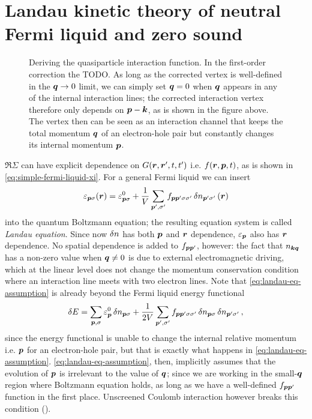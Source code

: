 \documentclass[hyperref, a4paper]{article}
\newcommand*{\term}[1]{\textit{#1}}
\begin{document}
\section{Landau kinetic theory of neutral Fermi liquid and zero sound} 

\begin{figure}
    \centering
    
    \caption{Deriving the quasiparticle interaction function.
    In the first-order correction the TODO.
    As long as the corrected vertex is well-defined in the $\vb*{q} \to 0$ limit, 
    we can simply set $\vb*{q} = 0$ when $\vb*{q}$ appears 
    in any of the internal interaction lines;
    the corrected interaction vertex therefore only depends on $\vb*{p} - \vb*{k}$,
    as is shown in the figure above.
    The vertex then can be seen as an interaction channel 
    that keeps the total momentum $\vb*{q}$ of an electron-hole pair 
    but constantly changes its internal momentum $\vb*{p}$.}
\end{figure}

$\Re \Sigma$ can have explicit dependence on $G(\vb*{r}, \vb*{r}', t, t')$
i.e. $f(\vb*{r}, \vb*{p}, t)$,
as is shown in \eqref{eq:simple-fermi-liquid-xi}.
For a general Fermi liquid we can insert
\begin{equation}
    \varepsilon_{\vb*{p} \sigma}(\vb*{r}) = \varepsilon^0_{\vb*{p} \sigma} + 
    \frac{1}{V} \sum_{\vb*{p}', \sigma'} f_{\vb*{p} \vb*{p}' \sigma \sigma'} \var{n}_{\vb*{p}' \sigma'} (\vb*{r})
    \label{eq:landau-eq-assumption}
\end{equation}
into the quantum Boltzmann equation;
the resulting equation system is called \term{Landau equation}.
Since now $\var{n}$ has both $\vb*{p}$ and $\vb*{r}$ dependence,
$\varepsilon_{\vb*{p}}$ also has $\vb*{r}$ dependence.
No spatial dependence is added to $f_{\vb*{p} \vb*{p}'}$, however:
the fact that $n_{\vb*{k} \vb*{q}}$ has a non-zero value when $\vb*{q} \neq 0$
is due to external electromagnetic driving, 
which at the linear level does not change
the momentum conservation condition 
where an interaction line meets with two electron lines.
Note that \eqref{eq:landau-eq-assumption} is already beyond 
the Fermi liquid energy functional
\begin{equation}
    \var{E} = \sum_{\vb*{p}, \sigma} \varepsilon^0_{\vb*{p}} \var{n}_{\vb*{p} \sigma}
    + \frac{1}{2V} \sum_{\vb*{p}', \sigma'} f_{\vb*{p} \vb*{p}' \sigma \sigma'}
    \var{n}_{\vb*{p} \sigma} \var{n}_{\vb*{p}' \sigma'},
\end{equation}
since the energy functional is unable to change the internal relative momentum
i.e. $\vb*{p}$ for an electron-hole pair,
but that is exactly what happens in \eqref{eq:landau-eq-assumption}.
\eqref{eq:landau-eq-assumption}, then, implicitly assumes 
that the evolution of $\vb*{p}$ is irrelevant to the value of $\vb*{q}$;
since we are working in the small-$\vb*{q}$ region where Boltzmann equation holds,
as long as we have a well-defined $f_{\vb*{p} \vb*{p}'}$ function 
in the first place.
Unscreened Coulomb interaction however breaks this condition
().
\end{document}
